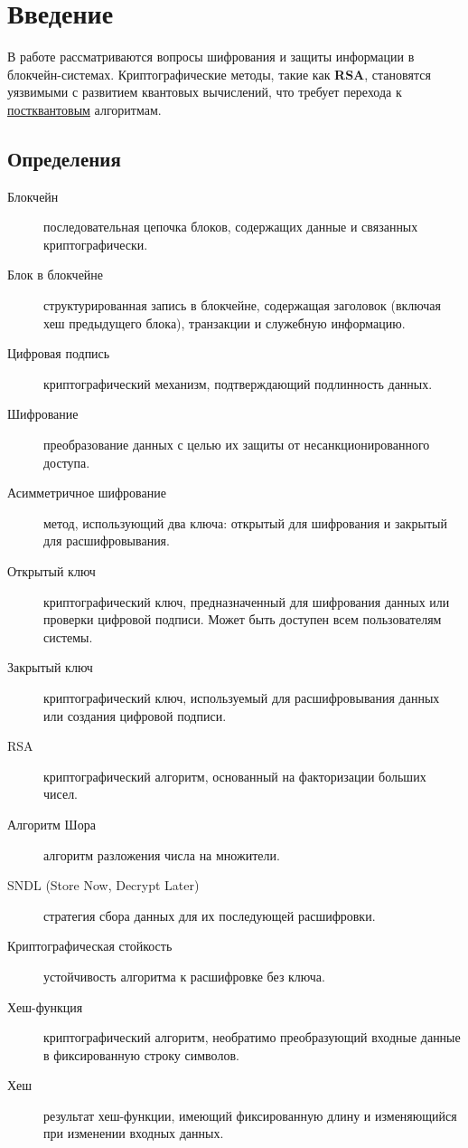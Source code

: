 \documentclass[a4paper]{article}
\begin{document}
\section{Введение}
В работе рассматриваются вопросы шифрования и защиты информации в блокчейн-системах. 
Криптографические методы, такие как \textbf{RSA}, становятся уязвимыми с развитием квантовых вычислений, 
что требует перехода к \underline{постквантовым} алгоритмам.

\subsection{Определения}
\begin{description}
    \item[Блокчейн] последовательная цепочка блоков, содержащих данные и связанных криптографически.
    \item[Блок в блокчейне] структурированная запись в блокчейне, содержащая заголовок (включая хеш предыдущего блока), транзакции и служебную информацию.
    \item[Цифровая подпись] криптографический механизм, подтверждающий подлинность данных.
    \item[Шифрование] преобразование данных с целью их защиты от несанкционированного доступа.
    \item[Асимметричное шифрование] метод, использующий два ключа: открытый для шифрования и закрытый для расшифровывания. %
    \item[Открытый ключ] криптографический ключ, предназначенный для шифрования данных или проверки цифровой подписи. Может быть доступен всем пользователям системы.  
    \item[Закрытый ключ] криптографический ключ, используемый для расшифровывания данных или создания цифровой подписи.
    \item[RSA] криптографический алгоритм, основанный на факторизации больших чисел.
    \item[Алгоритм Шора] алгоритм разложения числа на множители.
    \item[SNDL (Store Now, Decrypt Later)] стратегия сбора данных для их последующей расшифровки.
    \item[Криптографическая стойкость] устойчивость алгоритма к расшифровке без ключа.
    \item[Хеш-функция] криптографический алгоритм, необратимо преобразующий входные данные в фиксированную строку символов.
    \item[Хеш] результат хеш-функции, имеющий фиксированную длину и изменяющийся при изменении входных данных. %
\end{description}
\end{document}
